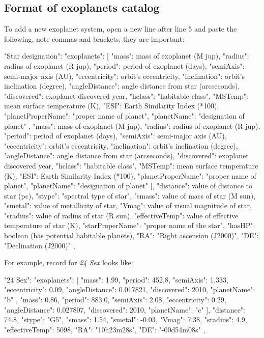 \subsection{Format of exoplanets catalog}
\label{sec:plugins:Exoplanets:format}

To add a new exoplanet system, open a new line after line 5 and paste the following, note commas and brackets, they are important:

\begin{configfile}
"Star designation":
{
	"exoplanets":
	[
	{
		"mass": mass of exoplanet (M jup),
		"radius": radius of exoplanet (R jup),
		"period": period of exoplanet (days),
		"semiAxis": semi-major axis (AU),
		"eccentricity": orbit's eccentricity,
		"inclination": orbit's inclination (degree),
		"angleDistance": angle distance from star 
		                 (arcseconds),
		"discovered": exoplanet discovered year,
		"hclass": "habitable class",
		"MSTemp": mean surface temperature (K),
		"ESI": Earth Similarity Index (*100),
		"planetProperName": "proper name of planet",
		"planetName": "designation of planet"
	},
	{
		"mass": mass of exoplanet (M jup),
		"radius": radius of exoplanet (R jup),
		"period": period of exoplanet (days),
		"semiAxis": semi-major axis (AU),
		"eccentricity": orbit's eccentricity,
		"inclination": orbit's inclination (degree),
		"angleDistance": angle distance from star 
		                 (arcseconds),
		"discovered": exoplanet discovered year,
		"hclass": "habitable class",
		"MSTemp": mean surface temperature (K),
		"ESI": Earth Similarity Index (*100),
		"planetProperName": "proper name of planet",
		"planetName": "designation of planet"
	}
	],
	"distance": value of distance to star (pc),
	"stype": "spectral type of star",
	"smass": value of mass of star (M sun),
	"smetal": value of metallicity of star,
	"Vmag": value of visual magnitude of star,
	"sradius": value of radius of star (R sun),
	"effectiveTemp": value of effective temperature 
	                 of star (K),
	"starProperName": "proper name of the star",
	"hasHP": boolean (has potential habitable planets),
	"RA": "Right ascension (J2000)",
	"DE": "Declination (J2000)"
},
\end{configfile}

\noindent For example, record for \textit{24 Sex} looks like:
\begin{configfile}
"24 Sex":
{
		"exoplanets":
		[
		{
			"mass": 1.99,
			"period": 452.8,
			"semiAxis": 1.333,
			"eccentricity": 0.09,
			"angleDistance": 0.017821,
			"discovered": 2010,
			"planetName": "b"
		},
		{
			"mass": 0.86,
			"period": 883.0,
			"semiAxis": 2.08,
			"eccentricity": 0.29,
			"angleDistance": 0.027807,
			"discovered": 2010,
			"planetName": "c"
		}
		],
		"distance": 74.8,
		"stype": "G5",
		"smass": 1.54,
		"smetal": -0.03,
		"Vmag": 7.38,
		"sradius": 4.9,
		"effectiveTemp": 5098,
		"RA": "10h23m28s",
		"DE": "-00d54m08s"
},
\end{configfile}


